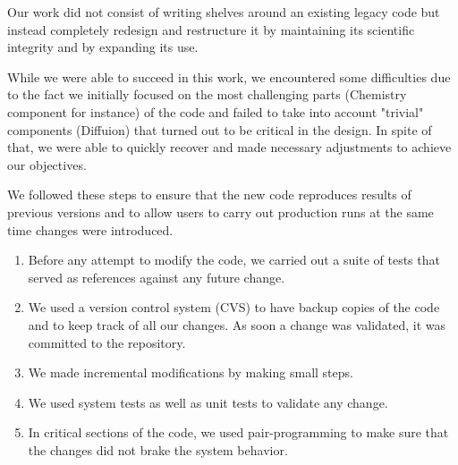 \documentclass[11pt]{article}
\def\bn{\begin{enumerate}}
\def\en{\end{enumerate}}
\begin{document}
Our work did not consist of writing shelves around an existing legacy code
but instead completely redesign and restructure it by maintaining its 
scientific integrity and by expanding its use.

While we were able to succeed in this work, we encountered
some difficulties due to the fact we initially focused on the most challenging parts
(Chemistry component for instance) of the code and failed to take into account 
"trivial" components (Diffuion) that 
turned out to be critical in the design.
In spite of that, we were able to quickly recover and made necessary adjustments
to achieve our objectives.

We followed these steps to ensure that the new code reproduces results of previous
versions and to allow users to carry out production runs at the same time changes were
introduced.
%
\bn
\item Before any attempt to modify the code, we carried out a suite of tests
      that served as references against any future change.
\item We used a version control system (CVS) to have backup copies of the code and
      to keep track of all our changes. As soon a change was validated, 
      it was committed to the repository.
\item We made incremental modifications by making small steps.
\item We used system tests as well as unit tests to validate any change.
\item In critical sections of the code, we used pair-programming to make sure
      that the changes did not brake the system behavior.
\en



%
\end{document}
